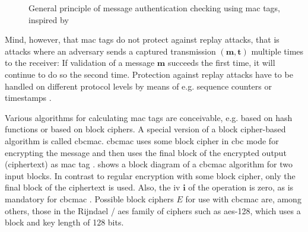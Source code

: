 \begin{figure}[h]
	\caption{General principle of message authentication checking using \gls{mac} tags, inspired by \cite[Figure 5]{sigfox_secure}}
	\label{fig:macprinciple}
\end{figure}

Mind, however, that \gls{mac} tags do not protect against replay attacks, that is attacks where an adversary sends a captured transmission $(\mathbf m, \mathbf t)$ multiple times to the receiver: If validation of a message $\mathbf m$ succeeds the first time, it will continue to do so the second time.
Protection against replay attacks have to be handled on different protocol levels by means of e.g. sequence counters or timestamps \cite[Section 4.2, replay attacks]{moderncryptography}.

Various algorithms for calculating \gls{mac} tags are conceivable, e.g. based on hash functions \cite[Section 5.3]{moderncryptography} or based on block ciphers.
A special version of a block cipher-based algorithm is called \gls{cbcmac}.
\gls{cbcmac} uses some block cipher in \gls{cbc} mode for encrypting the message and then uses the final block of the encrypted output (ciphertext) as \gls{mac} tag \cite[Section 4.4]{moderncryptography}.
 shows a block diagram of a \gls{cbcmac} algorithm for two input blocks.
In contrast to regular encryption with some block cipher, only the final block of the ciphertext is used.
Also, the \gls{iv} $\mathbf i$ of the operation is zero, as is mandatory for \gls{cbcmac} \cite[Section 4.4.1]{moderncryptography}.
Possible block ciphers $E$ for use with \gls{cbcmac} are, among others, those in the Rijndael / \gls{aes} family of ciphers such as \gls{aes}-128, which uses a block and key length of 128 bits.

